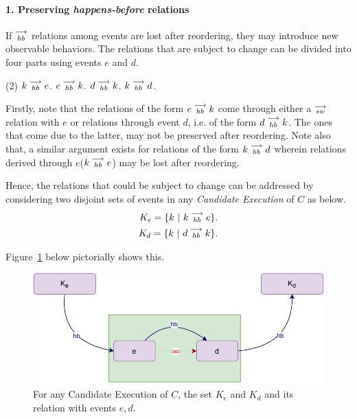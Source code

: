 
\paragraph{1. Preserving \textit{happens-before} relations}
        
    If $\stackrel{\longrightarrow}{_{hb}}$ relations among events are lost after reordering, they may introduce new observable behaviors. The relations that are subject to change can be divided into four parts using events $e$ and $d$.
    \begin{tasks}(2)
        \task $k\stackrel{\longrightarrow}{_{hb}}e$.
        \task $e\stackrel{\longrightarrow}{_{hb}}k$.
        \task $d\stackrel{\longrightarrow}{_{hb}}k$.
        \task $k\stackrel{\longrightarrow}{_{hb}}d$.
    \end{tasks}

    Firstly, note that the relations of the form $e\stackrel{\longrightarrow}{_{hb}}k$ come through either a $\stackrel{\longrightarrow}{_{sw}}$ relation with $e$ or relations through event $d$, i.e. of the form $d\stackrel{\longrightarrow}{_{hb}}k$. 
    The ones that come due to the latter, may not be preserved after reordering. 
    Note also that, a similar argument exists for relations of the form $k\stackrel{\longrightarrow}{_{hb}}d$ wherein relations derived through $e$($k\stackrel{\longrightarrow}{_{hb}}e$) may be lost after reordering. 

    Hence, the relations that could be subject to change can be addressed by considering two disjoint sets of events in any \textit{Candidate Execution} of $C$ as below.
    \begin{align*}
       K_e = \{k \ | \ k\stackrel{\longrightarrow}{_{hb}}e \}. \\
       K_d = \{k \ | \ d\stackrel{\longrightarrow}{_{hb}}k \}. 
    \end{align*}

    Figure~\ref{reord:preserve_hb(a)} below pictorially shows this.
    \begin{figure}[H]
        \centering
        \includegraphics[scale=0.7]{4.InstructionReordering/4.ValidReorderingCandidate/ProofParts/Part1/part1(a).pdf}
        \caption{For any Candidate Execution of $C$, the set $K_e$ and $K_d$ and its relation with events $e,d$.}
        \label{reord:preserve_hb(a)}
    \end{figure}
    
